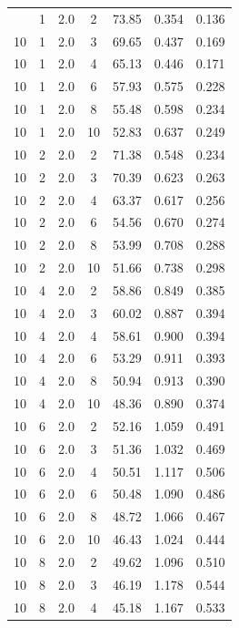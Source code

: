 \documentclass[11pt,a4paper]{article}
\begin{document}
\begin{longtable}{ccccccc}
\bottomrule
\endlastfoot
        10 &  1  &  2.0  & 2 & 73.85 & 0.354 & 0.136 \\
        10 &  1  &  2.0  & 3 & 69.65 & 0.437 & 0.169 \\
        10 &  1  &  2.0  & 4 & 65.13 & 0.446 & 0.171 \\
        10 &  1  &  2.0  & 6 & 57.93 & 0.575 & 0.228 \\
        10 &  1  &  2.0  & 8 & 55.48 & 0.598 & 0.234 \\
        10 &  1  &  2.0  & 10 & 52.83 & 0.637 & 0.249 \\
        \midrule
        10 &  2  &  2.0  & 2 & 71.38 & 0.548 & 0.234 \\
        10 &  2  &  2.0  & 3 & 70.39 & 0.623 & 0.263 \\
        10 &  2  &  2.0  & 4 & 63.37 & 0.617 & 0.256 \\
        10 &  2  &  2.0  & 6 & 54.56 & 0.670 & 0.274 \\
        10 &  2  &  2.0  & 8 & 53.99 & 0.708 & 0.288 \\
        10 &  2  &  2.0  & 10 & 51.66 & 0.738 & 0.298 \\
        \midrule
        10 &  4  &  2.0  & 2 & 58.86 & 0.849 & 0.385 \\
        10 &  4  &  2.0  & 3 & 60.02 & 0.887 & 0.394 \\
        10 &  4  &  2.0  & 4 & 58.61 & 0.900 & 0.394 \\
        10 &  4  &  2.0  & 6 & 53.29 & 0.911 & 0.393 \\
        10 &  4  &  2.0  & 8 & 50.94 & 0.913 & 0.390 \\
        10 &  4  &  2.0  & 10 & 48.36 & 0.890 & 0.374 \\
        \midrule
        10 &  6  &  2.0  & 2 & 52.16 & 1.059 & 0.491 \\
        10 &  6  &  2.0  & 3 & 51.36 & 1.032 & 0.469 \\
        10 &  6  &  2.0  & 4 & 50.51 & 1.117 & 0.506 \\
        10 &  6  &  2.0  & 6 & 50.48 & 1.090 & 0.486 \\
        10 &  6  &  2.0  & 8 & 48.72 & 1.066 & 0.467 \\
        10 &  6  &  2.0  & 10 & 46.43 & 1.024 & 0.444 \\
        \midrule
        10 &  8  &  2.0  & 2 & 49.62 & 1.096 & 0.510 \\
        10 &  8  &  2.0  & 3 & 46.19 & 1.178 & 0.544 \\
        10 &  8  &  2.0  & 4 & 45.18 & 1.167 & 0.533 \\

\end{longtable}
\end{document}

